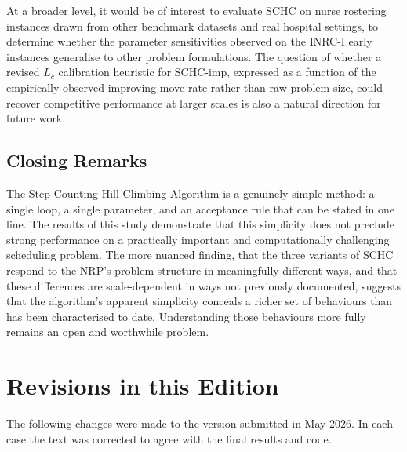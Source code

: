 \documentclass[12pt, a4paper, oneside]{report}
\begin{document}
At a broader level, it would be of interest to evaluate SCHC on
nurse rostering instances drawn from other benchmark datasets and
real hospital settings, to determine whether the parameter
sensitivities observed on the INRC-I early instances generalise to
other problem formulations. The question of whether a revised $L_c$
calibration heuristic for SCHC-imp, expressed as a function of the
empirically observed improving move rate rather than raw problem
size, could recover competitive performance at larger scales is also
a natural direction for future work.

\newpage
\section{Closing Remarks}
\label{sec:conc_closing}

The Step Counting Hill Climbing Algorithm is a genuinely simple
method: a single loop, a single parameter, and an acceptance rule
that can be stated in one line. The results of this study demonstrate
that this simplicity does not preclude strong performance on a
practically important and computationally challenging scheduling
problem. The more nuanced finding, that the three variants of SCHC
respond to the NRP's problem structure in meaningfully different
ways, and that these differences are scale-dependent in ways not
previously documented, suggests that the algorithm's apparent
simplicity conceals a richer set of behaviours than has been
characterised to date. Understanding those behaviours more fully
remains an open and worthwhile problem.

\appendix
\chapter{Revisions in this Edition}
\label{app:revisions}

The following changes were made to the version submitted in May
2026. In each case the text was corrected to agree with the final
results and code.
\end{document}
